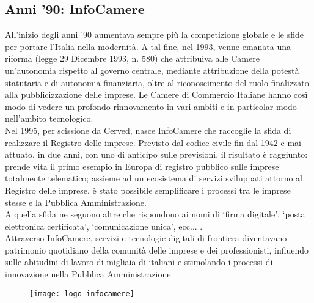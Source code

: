 	\subsection{Anni '90: InfoCamere}
	All'inizio degli anni '90 aumentava sempre più la competizione globale e le sfide per portare l'Italia nella modernità. A tal fine, nel 1993, venne emanata una riforma (legge 29 Dicembre 1993, n. 580) che attribuiva alle Camere un'autonomia rispetto al governo centrale, mediante attribuzione della potestà statutaria e di autonomia finanziaria, oltre al riconoscimento del ruolo finalizzato alla pubblicizzazione delle imprese. Le Camere di Commercio Italiane hanno così modo di vedere un profondo rinnovamento in vari ambiti e in particolar modo nell'ambito tecnologico. \\
	Nel 1995, per scissione da Cerved, nasce InfoCamere che raccoglie la sfida di realizzare il Registro delle imprese. Previsto dal codice civile fin dal 1942 e mai attuato, in due anni, con uno di anticipo sulle previsioni, il risultato è raggiunto: prende vita il primo esempio in Europa di registro pubblico sulle imprese  totalmente telematico; assieme ad un ecosistema di servizi sviluppati attorno al Registro delle imprese, è stato possibile semplificare i processi tra le imprese stesse e la Pubblica Amministrazione. \\
	A quella sfida ne seguono altre che rispondono ai nomi di ‘firma digitale’, ‘posta elettronica certificata’, ‘comunicazione unica’, ecc... . \\
	Attraverso InfoCamere, servizi e tecnologie digitali di frontiera diventavano patrimonio quotidiano della comunità delle imprese e dei professionisti, influendo sulle abitudini di lavoro di migliaia di italiani e stimolando i processi di innovazione nella Pubblica Amministrazione.
	
	\begin{figure}[htbp]
		\begin{center}
			\texttt{[image: logo-infocamere]}
		\end{center}
	\end{figure}

